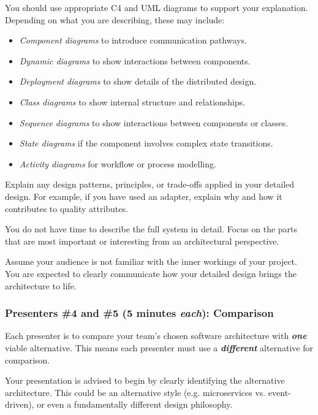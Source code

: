 \documentclass{csse4400}
\begin{document}
You should use appropriate C4 and UML diagrams to support your explanation.
Depending on what you are describing, these may include:

\begin{itemize}[topsep=5pt,partopsep=1pt,itemsep=3pt,parsep=3pt]
    \item \emph{Component diagrams} to introduce communication pathways.
    \item \emph{Dynamic diagrams} to show interactions between components.
    \item \emph{Deployment diagrams} to show details of the distributed design.
    \item \emph{Class diagrams} to show internal structure and relationships.
    \item \emph{Sequence diagrams} to show interactions between components or classes.
    \item \emph{State diagrams} if the component involves complex state transitions.
    \item \emph{Activity diagrams} for workflow or process modelling.
\end{itemize}

Explain any design patterns, principles, or trade-offs applied in your detailed design.
For example, if you have used an adapter, explain why and how it contributes to quality attributes.

You do not have time to describe the full system in detail.
Focus on the parts that are most important or interesting from an architectural perspective.

Assume your audience is not familiar with the inner workings of your project.
You are expected to clearly communicate how your detailed design brings the architecture to life.

\subsubsection{Presenters \#4 and \#5 (5 minutes \textit{each}): Comparison}

Each presenter is to compare your team's chosen software architecture with \textbf{\textit{one}} viable alternative.
This means each presenter must use a \textbf{\textit{different}} alternative for comparison.

Your presentation is advised to begin by clearly identifying the alternative architecture.
This could be an alternative style (e.g. microservices vs. event-driven),
or even a fundamentally different design philosophy.
\end{document}
